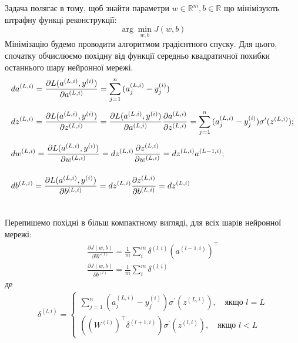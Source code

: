 \documentclass[14pt,a4paper]{extarticle}
\newcounter{e}
\numberwithin{equation}{section}
\numberwithin{figure}{section}
\newcommand{\ith}{^{(i)}}
\begin{document}
	Задача полягає в тому, щоб знайти параметри $w \in \mathbb{R}^{m}, b\in \mathbb{R}$ що мінімізують штрафну функці реконструкції:
	\begin{equation}
		\arg \min_{w, b} J (w, b)
	\end{equation}
	Мінімізацію будемо проводити алгоритмом градієнтного спуску. Для цього, спочатку обчислюємо похідну від функції середньо квадратичної похибки останнього шару нейронної мережі.
	\begin{equation}
		\begin{array}{l}
			\displaystyle
			da^{(L, i)}
			=
			\pdv{L(a^{(L, i)}, y\ith)}{a^{(L, i)}}
			=
			\sum_{j=1}^{n}{(a^{(L, i)}_j - y\ith_j)}
			\\[0.7cm]

			\displaystyle
			dz^{(L, i)}
			=
			\pdv{L(a^{(L, i)}, y\ith)}{z^{(L, i)}}
			= 
			\pdv{L(a^{(L, i)}, y\ith)}{a^{(L, i)}} \pdv{a^{(L, i)}}{z^{(L, i)}}
			=
			\sum_{j=1}^{n}{(a^{(L, i)}_j - y\ith_j)} \sigma^{\prime}(z^{(L, i)});
			\\[0.7cm]

			\displaystyle
			dw^{(L, i)} 
			=
			\pdv{L(a^{(L, i)}, y\ith)}{w^{(L, i)}}
			=
			dz^{(L, i)} \pdv{z^{(L, i)}}{w^{(L, i)}}
			=
			dz^{(L, i)} a^{(L-1, i)};
			\\[0.7cm]
	
			\displaystyle
			db^{(L, i)}
			=
			\pdv{L(a^{(L, i)}, y\ith)}{b^{(L, i)}}
			=
			dz^{(L, i)} \pdv{z^{(L, i)}}{b^{(L, i)}} 
			= 
			dz^{(L, i)}
			\\[0.7cm]
		\end{array}
	\end{equation}

	Перепишемо похідні в більш компактному вигляді, для всіх шарів нейронної мережі:
	\begin{equation}
		\begin{array}{l}
			\displaystyle
			\frac{\partial J(w, b)}{\partial W^{(l)}} =\frac{1}{m} \sum_{i}^{m} 	\delta^{(l, i)}\left(a^{(l-1, i)}\right)^{\top}
			\\[0.7cm]
	
			\displaystyle
			 \frac{\partial J(w, b)}{\partial b^{(l)}} =\frac{1}{m} \sum_{i}^{m} \delta^{(l, i)}
		\end{array}
	\end{equation}
	де
	\begin{equation}
		\begin{array}{l}
		\displaystyle
			\delta^{(l, i)}
			=
			\left\{
			\begin{array}{l}
				\displaystyle
				\sum_{j=1}^{n}{ \left(a^{(L, i)}_j - y\ith_j\right)} \sigma^{\prime}(z^{(L, i)}), \quad \text{якщо } l = L
				\\[0.7cm]
				
				\displaystyle
				\left((W^{(l)})^{\top} \delta^{(l+1, i)} \right) \sigma^{\prime} (z^{(l, i)}), \quad \text{якщо } l < L
			\end{array}\right.
		\end{array}
	\end{equation}
\end{document}
